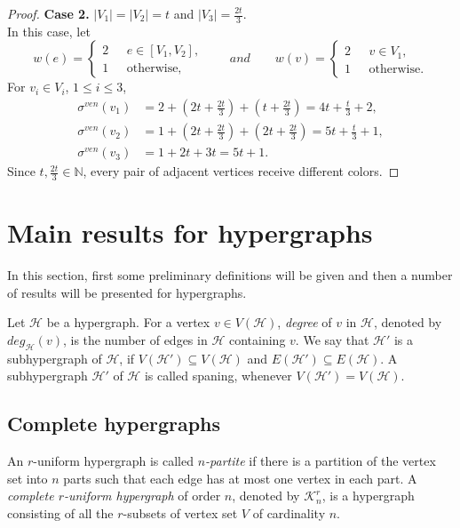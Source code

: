 \documentclass[12pt,a4paper]{article}
\begin{document}
\begin{proof}
	\textbf{Case 2.}
	$ |V_1|= |V_2| =t $ and $ |V_3|=\frac{2t}{3} $.\\
	In this case, let
	\begin{equation*}
	w(e)=
	\left\{
	\begin{array}{cl}
	2 & \ \ \ e\in [V_1,V_2],  \\
	1 & \ \ \ \text{otherwise,}
	\end{array}
	\right.
	\qquad and \qquad
	w(v)=
	\left\{
	\begin{array}{cl}
	2 & \ \ \ v\in V_1,  \\
	1 & \ \ \ \text{otherwise.}
	\end{array}
	\right.
	\end{equation*}
	For $ v_i\in V_i $, $ 1\leq i\leq 3 $,
	\begin{align*}
	\sigma^{ven}(v_1)&=2+(2t+\frac{2t}{3})+(t+\frac{2t}{3})=4t+\frac{t}{3}+2,\\
	\sigma^{ven}(v_2)&=1+(2t+\frac{2t}{3})+(2t+\frac{2t}{3})=5t+\frac{t}{3}+1,\\
	\sigma^{ven}(v_3)&=1+2t+3t=5t+1.
	\end{align*}
	Since $ t, \frac{2t}{3}\in \mathbb{N} $, every pair of adjacent vertices receive different colors.
\end{proof}

\section{Main results for hypergraphs}\label{hgraphs}
In this section, first some preliminary definitions will be given and then a number of results will be presented for hypergraphs.

Let $\mathcal{H}$ be a hypergraph.
For  a vertex $v \in V(\mathcal{H})$,\textit{ degree }of $v$ in $\mathcal{H}$, denoted by $deg_\mathcal{H}(v)$, is the number of edges in $\mathcal{H}$ containing $v$. We say that $\mathcal{H}'$ is a subhypergraph of $\mathcal{H}$, if $V(\mathcal{H}')\subseteq V(\mathcal{H})$ and $E(\mathcal{H}')\subseteq E(\mathcal{H})$. A subhypergraph $\mathcal{H}'$ of $\mathcal{H}$ is called spaning, whenever  $V(\mathcal{H}')= V(\mathcal{H})$.

\subsection{Complete hypergraphs}
An $r$-uniform hypergraph is called \textit{$n$-partite} if there is a partition of the vertex set into $n$ parts such that each edge
has at most  one vertex in each part.
A {\it complete $r$-uniform  hypergraph} of
order $n$, denoted by { $\mathcal{K}_n^r$}, is a hypergraph  consisting of
all the $r$-subsets of  vertex set $V$ of cardinality $n$.
\end{document}
